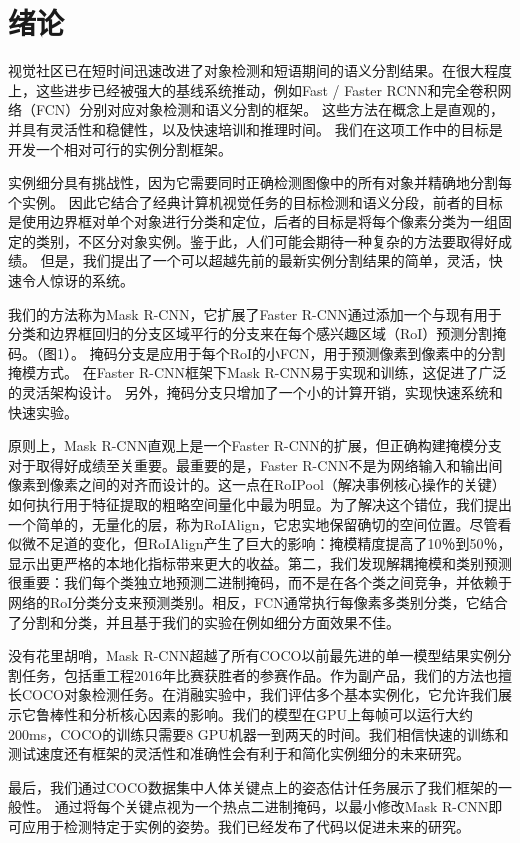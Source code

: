 \chapter{绪论}
视觉社区已在短时间迅速改进了对象检测和短语期间的语义分割结果。在很大程度上，这些进步已经被强大的基线系统推动，例如Fast / Faster RCNN和完全卷积网络（FCN）分别对应对象检测和语义分割的框架。 这些方法在概念上是直观的，并具有灵活性和稳健性，以及快速培训和推理时间。 我们在这项工作中的目标是开发一个相对可行的实例分割框架。\par
实例细分具有挑战性，因为它需要同时正确检测图像中的所有对象并精确地分割每个实例。 因此它结合了经典计算机视觉任务的目标检测和语义分段，前者的目标是使用边界框对单个对象进行分类和定位，后者的目标是将每个像素分类为一组固定的类别，不区分对象实例。鉴于此，人们可能会期待一种复杂的方法要取得好成绩。 但是，我们提出了一个可以超越先前的最新实例分割结果的简单，灵活，快速令人惊讶的系统。\par

我们的方法称为Mask R-CNN，它扩展了Faster R-CNN通过添加一个与现有用于分类和边界框回归的分支区域平行的分支来在每个感兴趣区域（RoI）预测分割掩码。（图1）。 掩码分支是应用于每个RoI的小FCN，用于预测像素到像素中的分割掩模方式。 在Faster R-CNN框架下Mask R-CNN易于实现和训练，这促进了广泛的灵活架构设计。 另外，掩码分支只增加了一个小的计算开销，实现快速系统和快速实验。\par
原则上，Mask R-CNN直观上是一个Faster R-CNN的扩展，但正确构建掩模分支对于取得好成绩至关重要。最重要的是，Faster R-CNN不是为网络输入和输出间像素到像素之间的对齐而设计的。这一点在RoIPool（解决事例核心操作的关键）如何执行用于特征提取的粗略空间量化中最为明显。为了解决这个错位，我们提出一个简单的，无量化的层，称为RoIAlign，它忠实地保留确切的空间位置。尽管看似微不足道的变化，但RoIAlign产生了巨大的影响：掩模精度​​提高了10％到50％，显示出更严格的本地化指标带来更大的收益。第二，我们发现解耦掩模和类别预测很重要：我们每个类独立地预测二进制掩码，而不是在各个类之间竞争，并依赖于网络的RoI分类分支来预测类别。相反，FCN通常执行每像素多类别分类，它结合了分割和分类，并且基于我们的实验在例如细分方面效果不佳。\par
没有花里胡哨，Mask R-CNN超越了所有COCO以前最先进的单一模型结果实例分割任务，包括重工程2016年比赛获胜者的参赛作品。作为副产品，我们的方法也擅长COCO对象检测任务。在消融实验中，我们评估多个基本实例化，它允许我们展示它鲁棒性和分析核心因素的影响。我们的模型在GPU上每帧可以运行大约200ms，COCO的训练只需要8 GPU机器一到两天的时间。我们相信快速的训练和测试速度还有框架的灵活性和准确性会有利于和简化实例细分的未来研究。\par
最后，我们通过COCO数据集中人体关键点上的姿态估计任务展示了我们框架的一般性。 通过将每个关键点视为一个热点二进制掩码，以最小修改Mask R-CNN即可应用于检测特定于实例的姿势。我们已经发布了代码以促进未来的研究。\par
